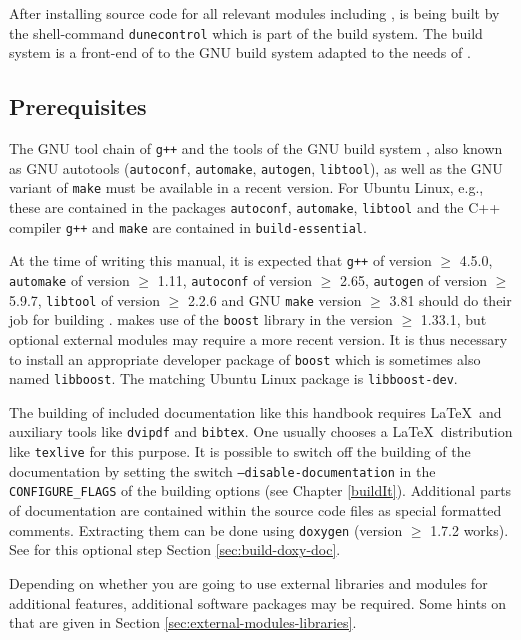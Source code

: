 After installing source code for all relevant \Dune modules including \Dumux, \Dune is being built by the shell-command \texttt{dunecontrol} which is part of the \Dune build system. The \Dune build system is a front-end of to the GNU build system adapted to the needs of \Dune.

\subsection{Prerequisites} \label{sec:prerequisites}
The GNU tool chain of \texttt{g++}  and the tools of the GNU build system \cite{GNU-BS}, also known as GNU autotools
(\texttt{autoconf}, \texttt{automake}, \texttt{autogen}, \texttt{libtool}), as well as the GNU variant of \texttt{make}
must be available in a recent version. For Ubuntu Linux, e.g.,  these are contained in the
packages \texttt{autoconf}, \texttt{automake}, \texttt{libtool}
and the C++ compiler \texttt{g++} and \texttt{make} are contained in \texttt{build-essential}.

At the time of writing this manual, it is expected that \texttt{g++} of version $\geqslant$ 4.5.0, \texttt{automake} of version $\geqslant$ 1.11,
\texttt{autoconf} of version $\geqslant$ 2.65, \texttt{autogen} of version $\geqslant$ 5.9.7,  \texttt{libtool} of version $\geqslant$ 2.2.6
and GNU \texttt{make} version $\geqslant$ 3.81 should do their job for building \Dumux.
\Dumux makes use of the \texttt{boost} library in the version $\geqslant$ 1.33.1, but optional external modules may require a more recent version. 
It is thus necessary to install an appropriate developer package of \texttt{boost}
which is sometimes also named \texttt{libboost}. The matching Ubuntu Linux package is \texttt{libboost-dev}.

The building of included documentation like this handbook requires \LaTeX\  and auxiliary tools
like \texttt{dvipdf} and \texttt{bibtex}. One usually chooses a \LaTeX\  distribution like \texttt{texlive} for this purpose.
It is possible to switch off the building of the documentation by setting the switch \texttt{--disable-documentation} 
in the \texttt{CONFIGURE\_FLAGS} of the building options (see Chapter \ref{buildIt}).
Additional parts of documentation are contained within the source code files as special formatted comments.
Extracting them can be done using \texttt{doxygen} (version $\geqslant$ 1.7.2 works). 
See for this optional step Section \ref{sec:build-doxy-doc}.

Depending on whether you are going to use external libraries and modules for additional \Dune features, 
additional software packages may be required. Some hints on that are given in Section \ref{sec:external-modules-libraries}.

